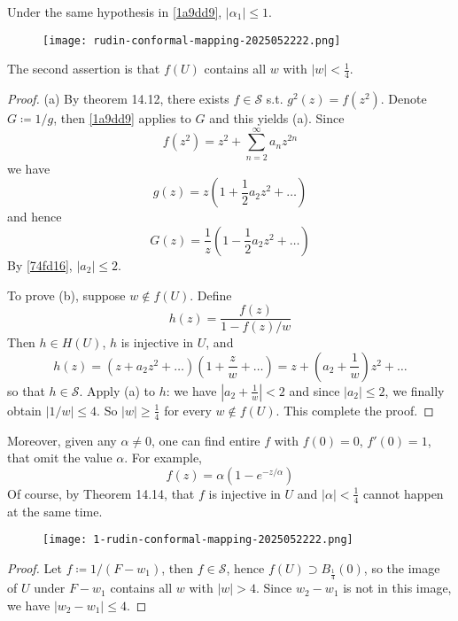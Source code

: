 \begin{corollary}
Under the same hypothesis in \cref{1a9dd9}, $\lvert \alpha_1 \rvert\leq1$.\label{74fd16}
\end{corollary}

\begin{figure}[H]
\centering
\texttt{[image: rudin-conformal-mapping-2025052222.png]}
\label{}
\end{figure}

\begin{note}
The second assertion is that $f(U)$ contains all $w$ with $\lvert w \rvert<\frac{1}{4}$.
\end{note}
\begin{proof}
(a) By theorem 14.12, there exists $f\in \mathscr{S}$ s.t. $g^2(z)=f(z^2)$. Denote $G\coloneqq1/g$, then \cref{1a9dd9} applies to $G$ and this yields (a). Since
\[
f(z^2)=z^2+\sum_{n=2}^{\infty} a_nz^{2n}
\]
we have
\[
g(z)=z\left( 1+\frac{1}{2}a_2z^2+\dots \right)
\]
and hence
\[
G(z)=\frac{1}{z}\left( 1-\frac{1}{2}a_2z^2+\dots \right)
\]
By \cref{74fd16}, $\lvert a_2 \rvert\leq2$.

To prove (b), suppose $w\not\in f (U)$. Define
\[
h(z)=\frac{f(z)}{1-f(z)/w}
\]
Then $h\in H(U)$, $h$ is injective in $U$, and
\[
h(z)=(z+a_2z^2+\dots)\left( 1+\frac{z}{w} +\dots\right)=z+\left( a_2+\frac{1}{w} \right)z^2+\dots
\]
so that $h\in \mathscr{S}$. Apply (a) to $h$: we have $\left\lvert  a_2+\frac{1}{w}  \right\rvert<2$ and since $\lvert a_2 \rvert\leq2$, we finally obtain $\lvert 1/w  \rvert\leq4$. So $\lvert w \rvert\geq\frac{1}{4}$ for every $w\not\in f (U)$. This complete the proof.
\end{proof}

Moreover, given any $\alpha\neq0$, one can find entire $f$ with $f(0)=0$, $f'(0)=1$, that omit the value $\alpha$. For example,
\[
f(z)=\alpha(1-e^{ -z/\alpha })
\]
Of course, by Theorem 14.14, that $f$ is injective in $U$ and $\lvert \alpha \rvert<\frac{1}{4}$ cannot happen at the same time.

\begin{figure}[H]
\centering
\texttt{[image: 1-rudin-conformal-mapping-2025052222.png]}
\label{}
\end{figure}

\begin{proof}
Let $f\coloneqq 1/(F-w_1)$, then $f\in \mathscr{S}$, hence $f(U)\supset B_{\frac{1}{4}}(0)$, so the image of $U$ under $F-w_1$ contains all $w$ with $\lvert w \rvert>4$. Since $w_2-w_1$ is not in this image, we have $\lvert w_2-w_1 \rvert\leq4$.
\end{proof}
